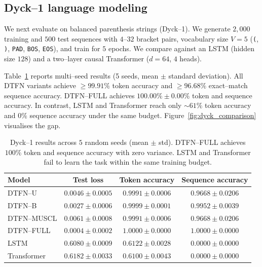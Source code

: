 \documentclass[10pt]{article}
\theoremstyle{definition}
\theoremstyle{remark}
\begin{document}
\subsection{Dyck--1 language modeling}
\label{sec:exp-dyck1}

We next evaluate on balanced parenthesis strings (Dyck--1).  We
generate $2{,}000$ training and $500$ test sequences with $4$--$32$
bracket pairs, vocabulary size $V=5$
(\texttt{(}, \texttt{)}, \texttt{PAD}, \texttt{BOS}, \texttt{EOS}),
and train for $5$ epochs.  We compare against an LSTM (hidden size
$128$) and a two--layer causal Transformer ($d=64$, $4$ heads).

Table~\ref{tab:dyck1-multiseed} reports multi--seed results (5 seeds,
mean $\pm$ standard deviation).  All DTFN variants achieve
$\ge 99.91\%$ token accuracy and $\ge 96.68\%$ exact--match sequence
accuracy.  DTFN--FULL achieves $100.00\% \pm 0.00\%$ token and
sequence accuracy.  In contrast, LSTM and Transformer reach only
$\sim 61\%$ token accuracy and $0\%$ sequence accuracy under the
same budget.  Figure~\ref{fig:dyck_comparison} visualises the gap.

\begin{table}[h]
  \centering
  \caption{Dyck--1 results across $5$ random seeds (mean $\pm$ std).
    DTFN--FULL achieves $100\%$ token and sequence accuracy with zero
    variance.  LSTM and Transformer fail to learn the task within the
    same training budget.}
  \label{tab:dyck1-multiseed}
  \begin{tabular}{lccc}
    \toprule
    Model & Test loss & Token accuracy & Sequence accuracy \\
    \midrule
    DTFN--U       & $0.0046 \pm 0.0005$ & $0.9991 \pm 0.0006$ & $0.9668 \pm 0.0206$ \\
    DTFN--B       & $0.0027 \pm 0.0006$ & $0.9999 \pm 0.0001$ & $0.9952 \pm 0.0039$ \\
    DTFN--MUSCL   & $0.0061 \pm 0.0008$ & $0.9991 \pm 0.0006$ & $0.9668 \pm 0.0206$ \\
    DTFN--FULL    & $0.0004 \pm 0.0002$ & $1.0000 \pm 0.0000$ & $1.0000 \pm 0.0000$ \\
    \midrule
    LSTM          & $0.6080 \pm 0.0009$ & $0.6122 \pm 0.0028$ & $0.0000 \pm 0.0000$ \\
    Transformer   & $0.6182 \pm 0.0033$ & $0.6100 \pm 0.0043$ & $0.0000 \pm 0.0000$ \\
    \bottomrule
  \end{tabular}
\end{table}
\end{document}
